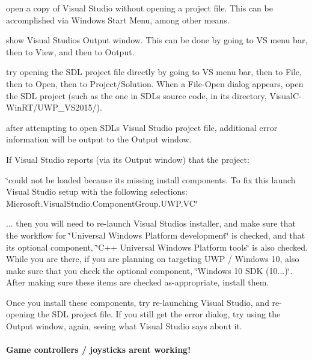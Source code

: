 \begin{DoxyEnumerate}
\item open a copy of Visual Studio without opening a project file. This can be accomplished via Windows\textquotesingle{} Start Menu, among other means.
\item show Visual Studio\textquotesingle{}s Output window. This can be done by going to VS\textquotesingle{} menu bar, then to View, and then to Output.
\item try opening the S\+DL project file directly by going to VS\textquotesingle{} menu bar, then to File, then to Open, then to Project/\+Solution. When a File-\/\+Open dialog appears, open the S\+DL project (such as the one in S\+DL\textquotesingle{}s source code, in its directory, Visual\+C-\/\+Win\+R\+T/\+U\+W\+P\+\_\+\+V\+S2015/).
\item after attempting to open S\+DL\textquotesingle{}s Visual Studio project file, additional error information will be output to the Output window.
\end{DoxyEnumerate}

If Visual Studio reports (via its Output window) that the project\+:

\char`\"{}could not be loaded because it\textquotesingle{}s missing install components. To fix this launch Visual Studio setup with the following selections\+:
\+Microsoft.\+Visual\+Studio.\+Component\+Group.\+U\+W\+P.\+V\+C\char`\"{}

... then you will need to re-\/launch Visual Studio\textquotesingle{}s installer, and make sure that the workflow for \char`\"{}\+Universal Windows Platform development\char`\"{} is checked, and that its optional component, \char`\"{}\+C++ Universal Windows Platform tools\char`\"{} is also checked. While you are there, if you are planning on targeting U\+WP / Windows 10, also make sure that you check the optional component, \char`\"{}\+Windows 10 S\+D\+K (10...)\char`\"{}. After making sure these items are checked as-\/appropriate, install them.

Once you install these components, try re-\/launching Visual Studio, and re-\/opening the S\+DL project file. If you still get the error dialog, try using the Output window, again, seeing what Visual Studio says about it.

\paragraph*{Game controllers / joysticks aren\textquotesingle{}t working!}

